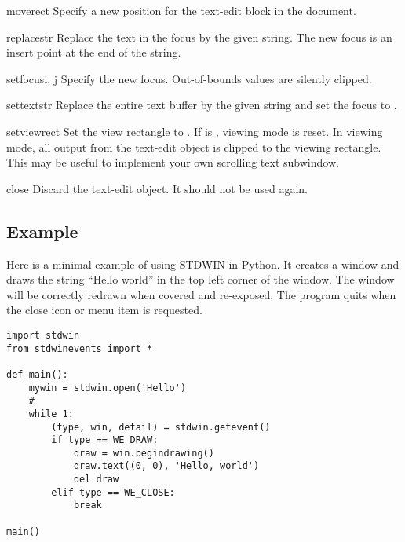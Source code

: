 \begin{funcdesc}{move}{rect}
Specify a new position for the text-edit block in the document.
\end{funcdesc}

\begin{funcdesc}{replace}{str}
Replace the text in the focus by the given string.
The new focus is an insert point at the end of the string.
\end{funcdesc}

\begin{funcdesc}{setfocus}{i, j}
Specify the new focus.
Out-of-bounds values are silently clipped.
\end{funcdesc}

\begin{funcdesc}{settext}{str}
Replace the entire text buffer by the given string and set the focus
to .
\end{funcdesc}

\begin{funcdesc}{setview}{rect}
Set the view rectangle to .  If  is ,
viewing mode is reset.  In viewing mode, all output from the text-edit
object is clipped to the viewing rectangle.  This may be useful to
implement your own scrolling text subwindow.
\end{funcdesc}

\begin{funcdesc}{close}{}
Discard the text-edit object.  It should not be used again.
\end{funcdesc}

\subsection{Example}

Here is a minimal example of using STDWIN in Python.
It creates a window and draws the string ``Hello world'' in the top
left corner of the window.
The window will be correctly redrawn when covered and re-exposed.
The program quits when the close icon or menu item is requested.

\begin{verbatim}
import stdwin
from stdwinevents import *

def main():
    mywin = stdwin.open('Hello')
    #
    while 1:
        (type, win, detail) = stdwin.getevent()
        if type == WE_DRAW:
            draw = win.begindrawing()
            draw.text((0, 0), 'Hello, world')
            del draw
        elif type == WE_CLOSE:
            break

main()
\end{verbatim}
%
